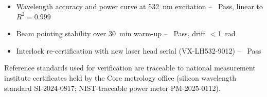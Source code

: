 \begin{itemize}[leftmargin=1.4em, itemsep=2pt]
  \item Wavelength accuracy and power curve at 532~nm excitation -- \okmark\ Pass, linear to $R^2 = 0.999$
  \item Beam pointing stability over 30~min warm-up -- \okmark\ Pass, drift $<$1~\textmu rad
  \item Interlock re-certification with new laser head serial (VX-LH532-9012) -- \okmark\ Pass
\end{itemize}

Reference standards used for verification are traceable to national measurement institute certificates held by the Core metrology office (silicon wavelength standard SI-2024-0817; NIST-traceable power meter PM-2025-0112).
